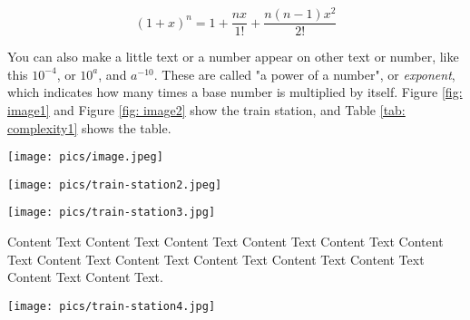 \begin{Chapter}
\begin{equation} 
    \mbox{$(1+x)^n = 1 + \dfrac{nx}{1!} + \dfrac{n(n-1)x^2}{2!}$}
\end{equation}

You can also make a little text or a number appear on other text or number, like this $10^{-4}$, or $10^{a}$, and $a^{-10}$. These are called "a power of a number", or \textit{exponent}, which indicates how many times a base number is multiplied by itself. Figure \ref{fig: image1} and Figure \ref{fig: image2} show the train station, and Table \ref{tab: complexity1} shows the table.

\begin{figure*}[htbp]
    \centering
    \texttt{[image: pics/image.jpeg]}
    \caption{Cool train station}
    \label{fig: image1}
\end{figure*}

\begin{figure*}[htbp]
    \centering
    \texttt{[image: pics/train-station2.jpeg]}
    \caption{This cool train station stands as a metaphor for life itself, everyone's waiting, no one knows when their train will arrive, and someone's always holding the wrong ticket. Yet, we all stand here pretending everything's fine, sipping overpriced coffee with quiet determination}
    \label{fig: image2}
\end{figure*}

\begin{figure*}[htbp]
    \centering
    \texttt{[image: pics/train-station3.jpg]}
    \caption{Cool train station}
    \label{fig: image3}
\end{figure*}

Content Text Content Text Content Text Content Text Content Text Content Text Content Text Content Text Content Text Content Text Content Text Content Text Content Text.

\begin{figure*}[htbp]
    \centering
    \texttt{[image: pics/train-station4.jpg]}
    \caption{Cool train station}
    \label{fig: image4}
\end{figure*}

\end{Chapter}